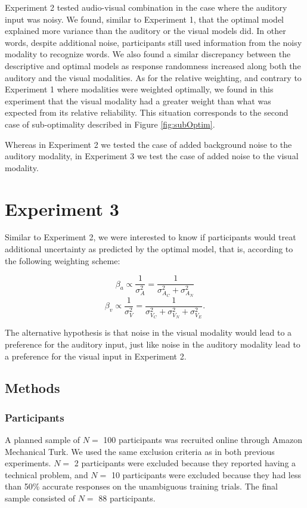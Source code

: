 \documentclass[english,,man,floatsintext]{apa6}
\theoremstyle{definition}
\theoremstyle{definition}
\theoremstyle{definition}
\theoremstyle{remark}
\begin{document}
Experiment 2 tested audio-visual combination in the case where the
auditory input was noisy. We found, similar to Experiment 1, that the
optimal model explained more variance than the auditory or the visual
models did. In other words, despite additional noise, participants still
used information from the noisy modality to recognize words. We also
found a similar discrepancy between the descriptive and optimal models
as response randomness increased along both the auditory and the visual
modalities. As for the relative weighting, and contrary to Experiment 1
where modalities were weighted optimally, we found in this experiment
that the visual modality had a greater weight than what was expected
from its relative reliability. This situation corresponds to the second
case of sub-optimality described in Figure \ref{fig:subOptim}.

Whereas in Experiment 2 we tested the case of added background noise to
the auditory modality, in Experiment 3 we test the case of added noise
to the visual modality.

\section{Experiment 3}\label{experiment-3}

Similar to Experiment 2, we were interested to know if participants
would treat additional uncertainty as predicted by the optimal model,
that is, according to the following weighting scheme:

\[\beta_a \propto \frac{1}{\sigma^2_{A}} = \frac{1}{\sigma^2_{A_C}+\sigma^2_{A_N}}\]
\[\beta_v \propto \frac{1}{\sigma^2_{V}} = \frac{1}{\sigma^2_{V_C}+\sigma^2_{V_N} + \sigma^2_{V_E}}.\]

The alternative hypothesis is that noise in the visual modality would
lead to a preference for the auditory input, just like noise in the
auditory modality lead to a preference for the visual input in
Experiment 2.

\subsection{Methods}\label{methods-2}

\subsubsection{Participants}\label{participants-2}

A planned sample of \(N =\) 100 participants was recruited online
through Amazon Mechanical Turk. We used the same exclusion criteria as
in both previous experiments. \(N =\) 2 participants were excluded
because they reported having a technical problem, and \(N =\) 10
participants were excluded because they had less than 50\% accurate
responses on the unambiguous training trials. The final sample consisted
of \(N =\) 88 participants.
\end{document}
